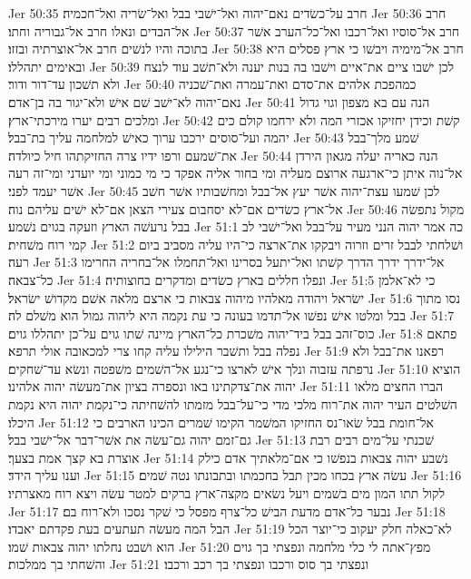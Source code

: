 Jer 50:35  חרב על־כשׂדים נאם־יהוה ואל־ישׁבי בבל ואל־שׂריה ואל־חכמיה׃
Jer 50:36  חרב אל־הבדים ונאלו חרב אל־גבוריה וחתו׃
Jer 50:37  חרב אל־סוסיו ואל־רכבו ואל־כל־הערב אשׁר בתוכה והיו לנשׁים חרב אל־אוצרתיה ובזזו׃
Jer 50:38  חרב אל־מימיה ויבשׁו כי ארץ פסלים היא ובאימים יתהללו׃
Jer 50:39  לכן ישׁבו ציים את־איים וישׁבו בה בנות יענה ולא־תשׁב עוד לנצח ולא תשׁכון עד־דור ודור׃
Jer 50:40  כמהפכת אלהים את־סדם ואת־עמרה ואת־שׁכניה נאם־יהוה לא־ישׁב שׁם אישׁ ולא־יגור בה בן־אדם׃
Jer 50:41  הנה עם בא מצפון וגוי גדול ומלכים רבים יערו מירכתי־ארץ׃
Jer 50:42  קשׁת וכידן יחזיקו אכזרי המה ולא ירחמו קולם כים יהמה ועל־סוסים ירכבו ערוך כאישׁ למלחמה עליך בת־בבל׃
Jer 50:43  שׁמע מלך־בבל את־שׁמעם ורפו ידיו צרה החזיקתהו חיל כיולדה׃
Jer 50:44  הנה כאריה יעלה מגאון הירדן אל־נוה איתן כי־ארגעה ארוצם מעליה ומי בחור אליה אפקד כי מי כמוני ומי יועדני ומי־זה רעה אשׁר יעמד לפני׃
Jer 50:45  לכן שׁמעו עצת־יהוה אשׁר יעץ אל־בבל ומחשׁבותיו אשׁר חשׁב אל־ארץ כשׂדים אם־לא יסחבום צעירי הצאן אם־לא ישׁים עליהם נוה׃
Jer 50:46  מקול נתפשׂה בבל נרעשׁה הארץ וזעקה בגוים נשׁמע׃
Jer 51:1  כה אמר יהוה הנני מעיר על־בבל ואל־ישׁבי לב קמי רוח משׁחית׃
Jer 51:2  ושׁלחתי לבבל זרים וזרוה ויבקקו את־ארצה כי־היו עליה מסביב ביום רעה׃
Jer 51:3  אל־ידרך ידרך הדרך קשׁתו ואל־יתעל בסרינו ואל־תחמלו אל־בחריה החרימו כל־צבאה׃
Jer 51:4  ונפלו חללים בארץ כשׂדים ומדקרים בחוצותיה׃
Jer 51:5  כי לא־אלמן ישׂראל ויהודה מאלהיו מיהוה צבאות כי ארצם מלאה אשׁם מקדושׁ ישׂראל׃
Jer 51:6  נסו מתוך בבל ומלטו אישׁ נפשׁו אל־תדמו בעונה כי עת נקמה היא ליהוה גמול הוא משׁלם לה׃
Jer 51:7  כוס־זהב בבל ביד־יהוה משׁכרת כל־הארץ מיינה שׁתו גוים על־כן יתהללו גוים׃
Jer 51:8  פתאם נפלה בבל ותשׁבר הילילו עליה קחו צרי למכאובה אולי תרפא׃
Jer 51:9  רפאנו את־בבל ולא נרפתה עזבוה ונלך אישׁ לארצו כי־נגע אל־השׁמים משׁפטה ונשׂא עד־שׁחקים׃
Jer 51:10  הוציא יהוה את־צדקתינו באו ונספרה בציון את־מעשׂה יהוה אלהינו׃
Jer 51:11  הברו החצים מלאו השׁלטים העיר יהוה את־רוח מלכי מדי כי־על־בבל מזמתו להשׁחיתה כי־נקמת יהוה היא נקמת היכלו׃
Jer 51:12  אל־חומת בבל שׂאו־נס החזיקו המשׁמר הקימו שׁמרים הכינו הארבים כי גם־זמם יהוה גם־עשׂה את אשׁר־דבר אל־ישׁבי בבל׃
Jer 51:13  שׁכנתי על־מים רבים רבת אוצרת בא קצך אמת בצעך׃
Jer 51:14  נשׁבע יהוה צבאות בנפשׁו כי אם־מלאתיך אדם כילק וענו עליך הידד׃
Jer 51:15  עשׂה ארץ בכחו מכין תבל בחכמתו ובתבונתו נטה שׁמים׃
Jer 51:16  לקול תתו המון מים בשׁמים ויעל נשׂאים מקצה־ארץ ברקים למטר עשׂה ויצא רוח מאצרתיו׃
Jer 51:17  נבער כל־אדם מדעת הבישׁ כל־צרף מפסל כי שׁקר נסכו ולא־רוח בם׃
Jer 51:18  הבל המה מעשׂה תעתעים בעת פקדתם יאבדו׃
Jer 51:19  לא־כאלה חלק יעקוב כי־יוצר הכל הוא ושׁבט נחלתו יהוה צבאות שׁמו׃
Jer 51:20  מפץ־אתה לי כלי מלחמה ונפצתי בך גוים והשׁחתי בך ממלכות׃
Jer 51:21  ונפצתי בך סוס ורכבו ונפצתי בך רכב ורכבו׃
